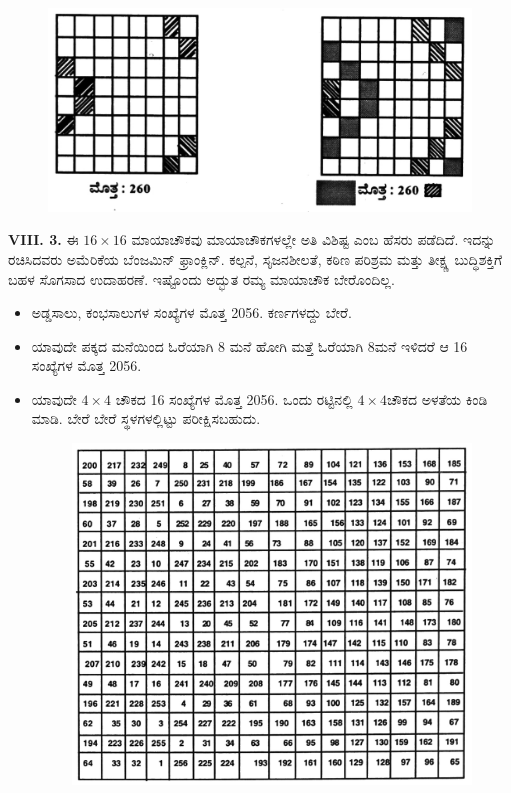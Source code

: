 \begin{figure}[H]
\includegraphics{src/figures/chap7/fig7.6.jpg}
\end{figure}

\textbf{VIII. 3.} ಈ $16 \times 16$ ಮಾಯಾಚೌಕವು ಮಾಯಾಚೌಕಗಳಲ್ಲೇ ಅತಿ ವಿಶಿಷ್ಟ ಎಂಬ ಹೆಸರು ಪಡೆದಿದೆ. ಇದನ್ನು ರಚಿಸಿದವರು ಅಮೆರಿಕೆಯ ಬೆಂಜಮಿನ್ ಫ್ರಾಂಕ್ಲಿನ್. ಕಲ್ಪನೆ, ಸೃಜನಶೀಲತೆ, ಕಠಿಣ ಪರಿಶ್ರಮ ಮತ್ತು ತೀಕ್ಷ್ಣ ಬುದ್ಧಿಶಕ್ತಿಗೆ ಬಹಳ ಸೊಗಸಾದ ಉದಾಹರಣೆ. ಇಷ್ಟೊಂದು ಅದ್ಭುತ ರಮ್ಯ ಮಾಯಾಚೌಕ ಬೇರೊಂದಿಲ್ಲ.

\begin{itemize}
	\item ಅಡ್ಡಸಾಲು, ಕಂಭಸಾಲುಗಳ ಸಂಖ್ಯೆಗಳ ಮೊತ್ತ 2056. ಕರ್ಣಗಳದ್ದು ಬೇರೆ.
	\item ಯಾವುದೇ ಪಕ್ಕದ ಮನೆಯಿಂದ ಓರೆಯಾಗಿ 8 ಮನೆ ಹೋಗಿ ಮತ್ತೆ ಓರೆಯಾಗಿ 8ಮನೆ ಇಳಿದರೆ ಆ 16 ಸಂಖ್ಯೆಗಳ ಮೊತ್ತ 2056.
	\item ಯಾವುದೇ $4 \times 4$ ಚೌಕದ 16 ಸಂಖ್ಯೆಗಳ ಮೊತ್ತ 2056. ಒಂದು ರಟ್ಟಿನಲ್ಲಿ $4 \times 4$ಚೌಕದ ಅಳತೆಯ ಕಿಂಡಿ ಮಾಡಿ. ಬೇರೆ ಬೇರೆ ಸ್ಥಳಗಳಲ್ಲಿಟ್ಟು ಪರೀಕ್ಷಿಸಬಹುದು.
	\begin{figure}[H]
	\includegraphics{src/figures/chap7/fig7.7.jpg}
	\end{figure}
\end{itemize}

